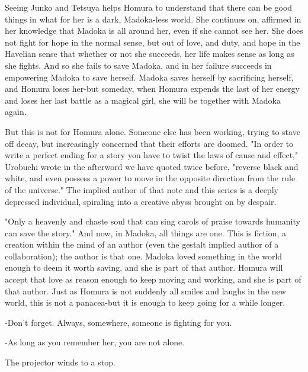 Seeing Junko and Tetsuya helps Homura to understand that there can be good things in what for her is a dark, Madoka-less world. She continues on, affirmed in her knowledge that Madoka is all around her, even if she cannot see her. She does not fight for hope in the normal sense, but out of love, and duty, and hope in the Havelian sense that whether or not she succeeds, her life makes sense as long as she fights. And so she fails to save Madoka, and in her failure succeeds in empowering Madoka to save herself. Madoka saves herself by sacrificing herself, and Homura loses her-but someday, when Homura expends the last of her energy and loses her last battle as a magical girl, she will be together with Madoka again.

But this is not for Homura alone. Someone else has been working, trying to stave off decay, but increasingly concerned that their efforts are doomed. "In order to write a perfect ending for a story you have to twist the laws of cause and effect," Urobuchi wrote in the afterword we have quoted twice before, "reverse black and white, and even possess a power to move in the opposite direction from the rule of the universe." \cite{ref93} The implied author of that note and this series is a deeply depressed individual, spiraling into a creative abyss brought on by despair.

"Only a heavenly and chaste soul that can sing carols of praise towards humanity can save the story." And now, in Madoka, all things are one. This is fiction, a creation within the mind of an author (even the gestalt implied author of a collaboration); the author is that one. Madoka loved something in the world enough to deem it worth saving, and she is part of that author. Homura will accept that love as reason enough to keep moving and working, and she is part of that author. Just as Homura is not suddenly all smiles and laughs in the new world, this is not a panacea-but it is enough to keep going for a while longer.

-Don't forget. Always, somewhere, someone is fighting for you.

-As long as you remember her, you are not alone.

The projector winds to a stop.
